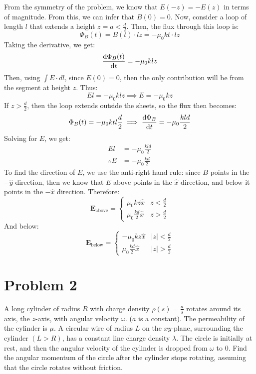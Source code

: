 \documentclass[10pt]{article}
\begin{document}
\begin{enumerate}[label=\alph*)]
			\begin{solution}
				From the symmetry of the problem, we know that $E(-z) = -E(z)$ in terms of magnitude. From this,
				we can infer that $B(0) = 0$. Now, consider a loop of length $l$ that extends a height $z = a < 
				\frac{d}{2}$. Then, the flux through this loop is: 
				\[
				\Phi_B(t) = B(t) \cdot lz = -\mu_0 kt \cdot lz 
				\] 
				Taking the derivative, we get:
				\[
					\dv{\Phi_B(t)}{t} = -\mu_0 klz
				\] 
				Then, using $\int E \cdot dl$, since $E(0) = 0$, then the only contribution will be from 
				the segment at height $z$. Thus:
				\[
				El = -\mu_0 klz \implies E = -\mu_0 kz
				\] 
				If $z > \frac{d}{2}$, then the loop extends outside the sheets, so the flux then becomes: 
				\[
					\Phi_B(t) = -\mu_0 kt l \frac{d}{2} \implies \dv{\Phi_B}{t} = -\mu_0 \frac{kld}{2}
				\] 
				Solving for $E$, we get: 
				\begin{align*}
					El &= -\mu_0 \frac{kld}{2}\\
					\therefore E &= -\mu_0 \frac{kd}{2}
				\end{align*}
				To find the direction of $E$, we use the anti-right hand rule: since $B$ points in the $-\hat{y}$
				direction, then we know that $E$ above points in the $\hat{x}$ direction, and below it points
				in the $-\hat{x}$ direction. Therefore: 
				\[
					\mathbf E_{\text{above}} = \begin{cases}
						\mu_0 kz \hat{x} & z < \frac{d}{2}\\
						\mu_0 \frac{kd}{2}\hat{x}  & z > \frac{d}{2}
					\end{cases} 
				\] 
				And below:
				\[
					\mathbf E_{\text{below}} = \begin{cases}
						-\mu_0kz \hat{x} & |z| < \frac{d}{2}\\
						\mu_0 \frac{kd}{2}\hat{x}  & |z| > \frac{d}{2}
					\end{cases}
				\] 
			\end{solution}
	\end{enumerate}
	

	\pagebreak
	\section*{Problem 2}
	A long cylinder of radius $R$ with charge density $\rho(s) = \frac{a}{s}$ rotates around its axis, the
	$z$-axis, with angular velocity $\omega$. ($a$ is a constant). The permeability of the cylinder is $\mu$.
	A circular wire of radius $L$ on the $xy$-plane, surrounding the cylinder $(L > R)$, has a constant 
	line charge density $\lambda$. The circle is initially at rest, and then the angular velocity of 
	the cylinder is dropped from $\omega$ to 0. Find the angular momentum of the circle after the 
	cylinder stops rotating, assuming that the circle rotates without friction. 
\end{document}
